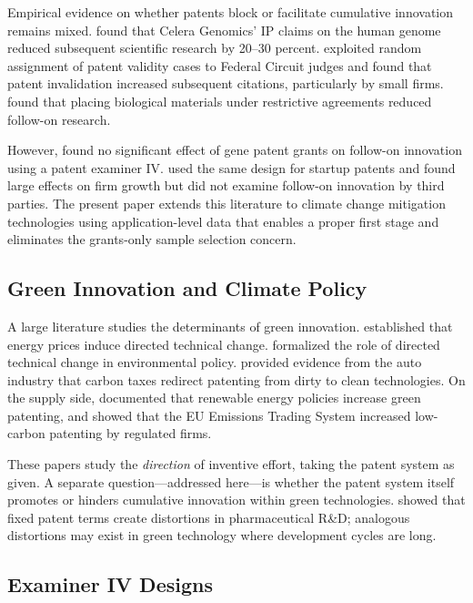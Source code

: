 \documentclass[12pt]{article}
\begin{document}
Empirical evidence on whether patents block or facilitate cumulative innovation remains mixed. \citet{williams2013} found that Celera Genomics' IP claims on the human genome reduced subsequent scientific research by 20--30 percent. \citet{galasso2015} exploited random assignment of patent validity cases to Federal Circuit judges and found that patent invalidation increased subsequent citations, particularly by small firms. \citet{murray2007} found that placing biological materials under restrictive agreements reduced follow-on research.

However, \citet{sampat2019} found no significant effect of gene patent grants on follow-on innovation using a patent examiner IV. \citet{farremensa2020} used the same design for startup patents and found large effects on firm growth but did not examine follow-on innovation by third parties. The present paper extends this literature to climate change mitigation technologies using application-level data that enables a proper first stage and eliminates the grants-only sample selection concern.

\subsection{Green Innovation and Climate Policy}

A large literature studies the determinants of green innovation. \citet{popp2002} established that energy prices induce directed technical change. \citet{acemoglu2012} formalized the role of directed technical change in environmental policy. \citet{aghion2016} provided evidence from the auto industry that carbon taxes redirect patenting from dirty to clean technologies. On the supply side, \citet{johnstone2010} documented that renewable energy policies increase green patenting, and \citet{calel2020} showed that the EU Emissions Trading System increased low-carbon patenting by regulated firms.

These papers study the \emph{direction} of inventive effort, taking the patent system as given. A separate question---addressed here---is whether the patent system itself promotes or hinders cumulative innovation within green technologies. \citet{budish2015} showed that fixed patent terms create distortions in pharmaceutical R\&D; analogous distortions may exist in green technology where development cycles are long.

\subsection{Examiner IV Designs}
\end{document}
